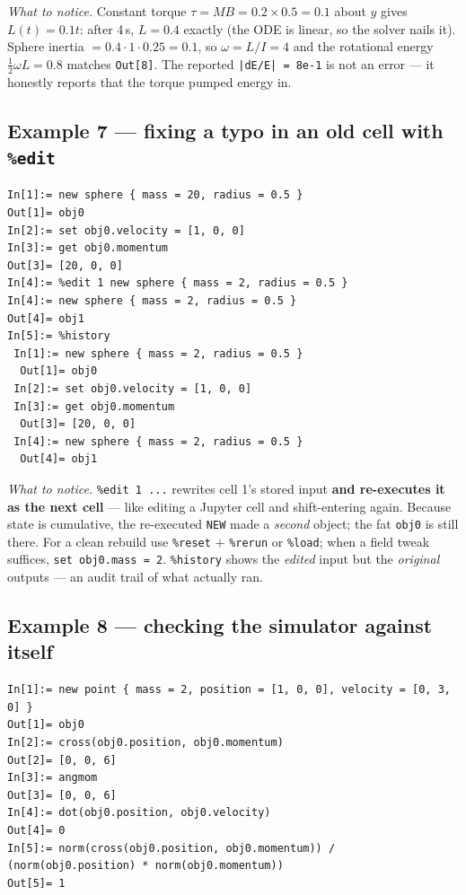 \documentclass[11pt]{article}
\newcommand{\kw}[1]{\texttt{\uppercase{#1}}}
\newcommand{\code}[1]{\texttt{#1}}
\begin{document}
\emph{What to notice.} Constant torque $\tau = MB = 0.2\times0.5 = 0.1$
about $y$ gives $L(t) = 0.1t$: after 4\,s, $L = 0.4$ exactly (the ODE is
linear, so the solver nails it). Sphere inertia
$= 0.4\cdot1\cdot0.25 = 0.1$, so $\omega = L/I = 4$ and the rotational
energy $\tfrac12\omega L = 0.8$ matches \code{Out[8]}. The reported
\code{|dE/E| = 8e-1} is not an error --- it honestly reports that the
torque pumped energy in.

\subsection{Example 7 --- fixing a typo in an old cell with \code{\%edit}}

\begin{lstlisting}
In[1]:= new sphere { mass = 20, radius = 0.5 }
Out[1]= obj0
In[2]:= set obj0.velocity = [1, 0, 0]
In[3]:= get obj0.momentum
Out[3]= [20, 0, 0]
In[4]:= %edit 1 new sphere { mass = 2, radius = 0.5 }
In[4]:= new sphere { mass = 2, radius = 0.5 }
Out[4]= obj1
In[5]:= %history
 In[1]:= new sphere { mass = 2, radius = 0.5 }
  Out[1]= obj0
 In[2]:= set obj0.velocity = [1, 0, 0]
 In[3]:= get obj0.momentum
  Out[3]= [20, 0, 0]
 In[4]:= new sphere { mass = 2, radius = 0.5 }
  Out[4]= obj1
\end{lstlisting}

\emph{What to notice.} \code{\%edit 1 ...} rewrites cell 1's stored
input \textbf{and re-executes it as the next cell} --- like editing a
Jupyter cell and shift-entering again. Because state is cumulative, the
re-executed \kw{new} made a \emph{second} object; the fat \code{obj0} is
still there. For a clean rebuild use \code{\%reset} + \code{\%rerun} or
\code{\%load}; when a field tweak suffices, \code{set obj0.mass = 2}.
\code{\%history} shows the \emph{edited} input but the \emph{original}
outputs --- an audit trail of what actually ran.

\subsection{Example 8 --- checking the simulator against itself}

\begin{lstlisting}
In[1]:= new point { mass = 2, position = [1, 0, 0], velocity = [0, 3, 0] }
Out[1]= obj0
In[2]:= cross(obj0.position, obj0.momentum)
Out[2]= [0, 0, 6]
In[3]:= angmom
Out[3]= [0, 0, 6]
In[4]:= dot(obj0.position, obj0.velocity)
Out[4]= 0
In[5]:= norm(cross(obj0.position, obj0.momentum)) / (norm(obj0.position) * norm(obj0.momentum))
Out[5]= 1
\end{lstlisting}
\end{document}

